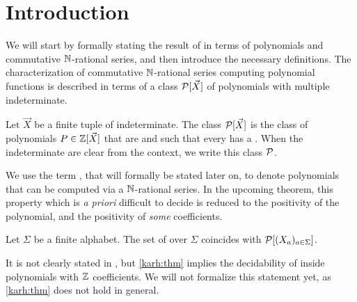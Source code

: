 \documentclass[a4paper,11pt]{article}
\begin{document}
\maketitle
\makeabstract
\acknowledge


\section{Introduction}

We will start by formally stating the result of \citeauthor{KARH77}
in terms of polynomials and commutative $\mathbb{N}$-rational series, and
then introduce the necessary definitions. The characterization of
commutative $\mathbb{N}$-rational series computing polynomial functions
is described in terms of a class $\mathcal{P}[\vec{X}]$ of
polynomials with multiple indeterminate.

\begin{definition}
    Let $\vec{X}$ be a finite tuple of indeterminate.
    The class $\mathcal{P}[\vec{X}]$
    is the class of polynomials $P \in \mathbb{Z}[\vec{X}]$
    that are 
    and such that every  has a .
    When the indeterminate are clear from the context, we write
    this class $\mathcal{P}$.
\end{definition}

We use the term , that will formally be
stated later on, to denote polynomials that can be computed via a
$\mathbb{N}$-rational series. In the upcoming theorem, this property
which is \emph{a priori} difficult to decide is reduced to 
the positivity of the polynomial, and the positivity of \emph{some}
coefficients. 


\begin{theorem} 
    \label{karh:thm}
    Let $\Sigma$ be a finite alphabet.
    The set of  over $\Sigma$
    coincides with $\mathcal{P}[(X_a)_{a \in \Sigma}]$.
\end{theorem}

It is not clearly stated in \cite{KARH77}, but \cref{karh:thm} implies the
decidability of  inside polynomials with $\mathbb{Z}$
coefficients. We will not formalize this statement yet, as \cref{karh:thm}
does not hold in general.
\end{document}
